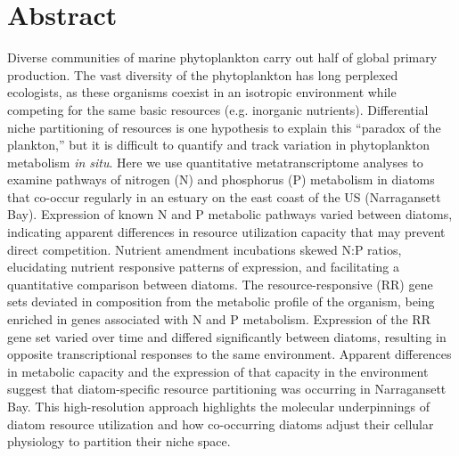 \section{Abstract}
Diverse communities of marine phytoplankton carry out half of global primary production. The vast diversity of the phytoplankton has long perplexed ecologists, as these organisms coexist in an isotropic environment while competing for the same basic resources (e.g. inorganic nutrients). Differential niche partitioning of resources is one hypothesis to explain this ``paradox of the plankton,'' but it is difficult to quantify and track variation in phytoplankton metabolism \textit{in situ}. Here we use quantitative metatranscriptome analyses to examine pathways of nitrogen (N) and phosphorus (P) metabolism in diatoms that co-occur regularly in an estuary on the east coast of the US (Narragansett Bay). Expression of known N and P metabolic pathways varied between diatoms, indicating apparent differences in resource utilization capacity that may prevent direct competition.  Nutrient amendment incubations skewed N:P ratios, elucidating nutrient responsive patterns of expression, and facilitating a quantitative comparison between diatoms. The resource-responsive (RR) gene sets deviated in composition from the metabolic profile of the organism, being enriched in genes associated with N and P metabolism. Expression of the RR gene set varied over time and differed significantly between diatoms, resulting in opposite transcriptional responses to the same environment. Apparent differences in metabolic capacity and the expression of that capacity in the environment suggest that diatom-specific resource partitioning was occurring in Narragansett Bay. This high-resolution approach highlights the molecular underpinnings of diatom resource utilization and how co-occurring diatoms adjust their cellular physiology to partition their niche space. 
 
